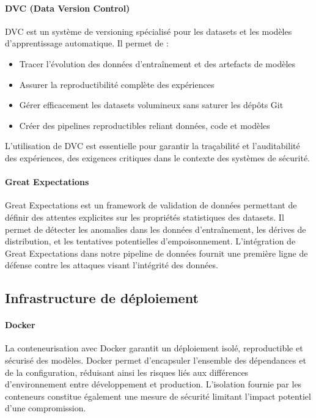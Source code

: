 \paragraph{DVC (Data Version Control)}
DVC est un système de versioning spécialisé pour les datasets et les modèles d'apprentissage automatique. Il permet de :
\begin{itemize}
    \item Tracer l'évolution des données d'entraînement et des artefacts de modèles
    \item Assurer la reproductibilité complète des expériences
    \item Gérer efficacement les datasets volumineux sans saturer les dépôts Git
    \item Créer des pipelines reproductibles reliant données, code et modèles
\end{itemize}
L'utilisation de DVC est essentielle pour garantir la traçabilité et l'auditabilité des expériences, des exigences critiques dans le contexte des systèmes de sécurité.

\paragraph{Great Expectations}
Great Expectations est un framework de validation de données permettant de définir des attentes explicites sur les propriétés statistiques des datasets. Il permet de détecter les anomalies dans les données d'entraînement, les dérives de distribution, et les tentatives potentielles d'empoisonnement. L'intégration de Great Expectations dans notre pipeline de données fournit une première ligne de défense contre les attaques visant l'intégrité des données.

\subsection{Infrastructure de déploiement}

\paragraph{Docker}
La conteneurisation avec Docker garantit un déploiement isolé, reproductible et sécurisé des modèles. Docker permet d'encapsuler l'ensemble des dépendances et de la configuration, réduisant ainsi les risques liés aux différences d'environnement entre développement et production. L'isolation fournie par les conteneurs constitue également une mesure de sécurité limitant l'impact potentiel d'une compromission.

